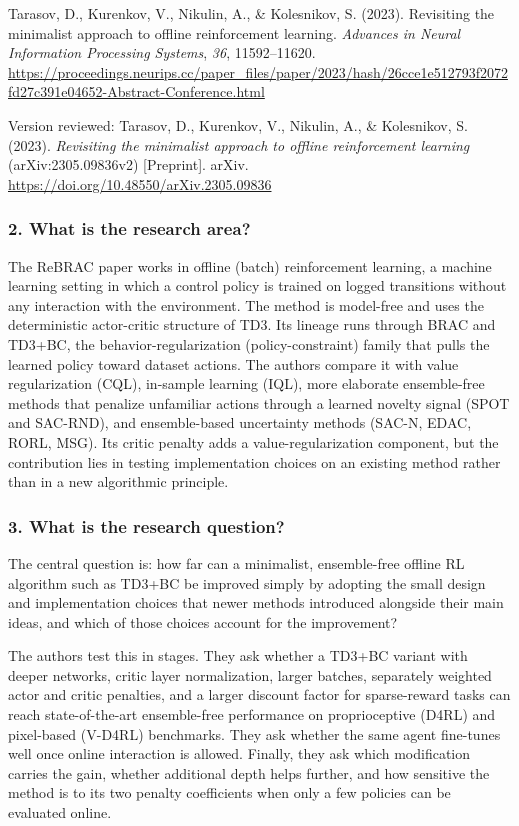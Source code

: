 \documentclass[11pt]{article}
\newenvironment{hangref}{\par\hangindent=0.5in\hangafter=1\noindent}{\par}
\newcommand{\question}[1]{\subsubsection*{#1}}
\begin{document}
\begin{hangref}Tarasov, D., Kurenkov, V., Nikulin, A., \& Kolesnikov, S. (2023). Revisiting the minimalist approach to offline reinforcement learning. \emph{Advances in Neural Information Processing Systems}, \emph{36}, 11592--11620. \url{https://proceedings.neurips.cc/paper_files/paper/2023/hash/26cce1e512793f2072fd27c391e04652-Abstract-Conference.html}\end{hangref}
\begin{hangref}Version reviewed: Tarasov, D., Kurenkov, V., Nikulin, A., \& Kolesnikov, S. (2023). \emph{Revisiting the minimalist approach to offline reinforcement learning} (arXiv:2305.09836v2) [Preprint]. arXiv. \url{https://doi.org/10.48550/arXiv.2305.09836}\end{hangref}

\question{2. What is the research area?}

The ReBRAC paper works in offline (batch) reinforcement learning, a machine learning setting in which a control policy is trained on logged transitions without any interaction with the environment. The method is model-free and uses the deterministic actor-critic structure of TD3. Its lineage runs through BRAC and TD3+BC, the behavior-regularization (policy-constraint) family that pulls the learned policy toward dataset actions. The authors compare it with value regularization (CQL), in-sample learning (IQL), more elaborate ensemble-free methods that penalize unfamiliar actions through a learned novelty signal (SPOT and SAC-RND), and ensemble-based uncertainty methods (SAC-N, EDAC, RORL, MSG). Its critic penalty adds a value-regularization component, but the contribution lies in testing implementation choices on an existing method rather than in a new algorithmic principle.

\question{3. What is the research question?}

The central question is: how far can a minimalist, ensemble-free offline RL algorithm such as TD3+BC be improved simply by adopting the small design and implementation choices that newer methods introduced alongside their main ideas, and which of those choices account for the improvement?

The authors test this in stages. They ask whether a TD3+BC variant with deeper networks, critic layer normalization, larger batches, separately weighted actor and critic penalties, and a larger discount factor for sparse-reward tasks can reach state-of-the-art ensemble-free performance on proprioceptive (D4RL) and pixel-based (V-D4RL) benchmarks. They ask whether the same agent fine-tunes well once online interaction is allowed. Finally, they ask which modification carries the gain, whether additional depth helps further, and how sensitive the method is to its two penalty coefficients when only a few policies can be evaluated online.
\end{document}
